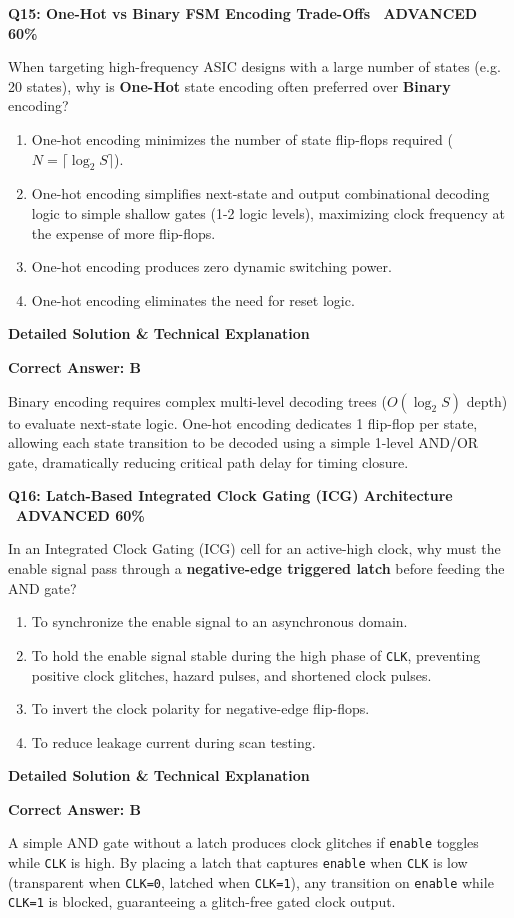 \documentclass[11pt,a4paper]{article}
\newcommand{\badgeadv}{{\color{white}\colorbox{advred}{\bfseries\sffamily\tiny\ ADVANCED 60\%\ }}}
\newenvironment{qbox}[2]{%
  \begin{mdframed}[style=qstyle]%
  {\bfseries\sffamily\color{primaryblue}#1 \hfill #2}\par\vspace{2pt}%
}{%
  \end{mdframed}%
}
\newenvironment{ansbox}{%
  \begin{mdframed}[style=ansstyle]%
  {\bfseries\sffamily\color{ansgreen}\small Detailed Solution \& Technical Explanation}\par\vspace{2pt}\small%
}{%
  \end{mdframed}%
}
\begin{document}
\begin{qbox}{Q15: One-Hot vs Binary FSM Encoding Trade-Offs}{\badgeadv}
When targeting high-frequency ASIC designs with a large number of states (e.g. 20 states), why is \textbf{One-Hot} state encoding often preferred over \textbf{Binary} encoding?
\begin{enumerate}[label=\textbf{\Alph*.}]
  \item One-hot encoding minimizes the number of state flip-flops required ($N = \lceil\log_2 S\rceil$).
  \item One-hot encoding simplifies next-state and output combinational decoding logic to simple shallow gates (1-2 logic levels), maximizing clock frequency at the expense of more flip-flops.
  \item One-hot encoding produces zero dynamic switching power.
  \item One-hot encoding eliminates the need for reset logic.
\end{enumerate}
\end{qbox}
\begin{ansbox}
\textbf{Correct Answer: B}

Binary encoding requires complex multi-level decoding trees ($O(\log_2 S)$ depth) to evaluate next-state logic. One-hot encoding dedicates 1 flip-flop per state, allowing each state transition to be decoded using a simple 1-level AND/OR gate, dramatically reducing critical path delay for timing closure.
\end{ansbox}

\begin{qbox}{Q16: Latch-Based Integrated Clock Gating (ICG) Architecture}{\badgeadv}
In an Integrated Clock Gating (ICG) cell for an active-high clock, why must the enable signal pass through a \textbf{negative-edge triggered latch} before feeding the AND gate?
\begin{enumerate}[label=\textbf{\Alph*.}]
  \item To synchronize the enable signal to an asynchronous domain.
  \item To hold the enable signal stable during the high phase of \texttt{CLK}, preventing positive clock glitches, hazard pulses, and shortened clock pulses.
  \item To invert the clock polarity for negative-edge flip-flops.
  \item To reduce leakage current during scan testing.
\end{enumerate}
\end{qbox}
\begin{ansbox}
\textbf{Correct Answer: B}

A simple AND gate without a latch produces clock glitches if \texttt{enable} toggles while \texttt{CLK} is high. By placing a latch that captures \texttt{enable} when \texttt{CLK} is low (transparent when \texttt{CLK=0}, latched when \texttt{CLK=1}), any transition on \texttt{enable} while \texttt{CLK=1} is blocked, guaranteeing a glitch-free gated clock output.
\end{ansbox}
\end{document}

